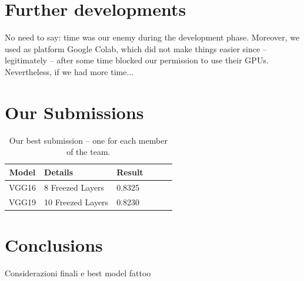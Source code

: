 \documentclass[10pt]{article}
\begin{document}
\section{Further developments}
No need to say: time was our enemy during the development phase. Moreover, we used as platform Google Colab, which did not make things easier since -- legitimately -- after some time blocked our permission to use their GPUs.\\[0.1cm]
Nevertheless, if we had more time...



\section{Our Submissions}
\begin{table}[ht]
\centering
\begin{adjustbox}{width=240}
\small
\begin{tabular}{|c|l|l|l|l|l}

\hline \bf Model & \bf Details & \bf Result \\ \hline
VGG16 & 8 Freezed Layers & 0.8325 \\
VGG19 & 10 Freezed Layers & 0.8230 \\
\hline
\end{tabular}
\end{adjustbox}
\caption{Our best submission -- one for each member of the team.}
\end{table}
\section{Conclusions}
Considerazioni finali e best model fattoo

\end{document}
